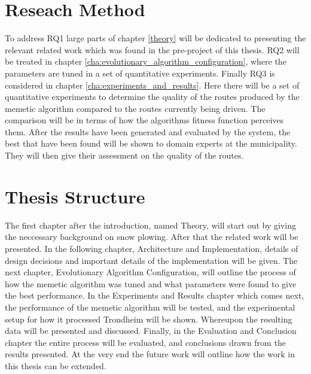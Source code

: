 \section{Reseach Method}

To address RQ1 large parts of chapter \ref{theory} will be dedicated to presenting the relevant related work which was found in the pre-project of this thesis. RQ2 will be treated in chapter \ref{cha:evolutionary_algorithm_configuration}, where the parameters are tuned in a set of quantitative experiments. Finally RQ3 is considered in chapter \ref{cha:experiments_and_results}. Here there will be a set of quantitative experiments to determine the quality of the routes produced by the memetic algorithm compared to the routes currently being driven. The comparison will be in terms of how the algorithms fitness function perceives them. After the results have been generated and evaluated by the system, the best that have been found will be shown to domain experts at the municipality. They will then give their assessment on the quality of the routes.

\section{Thesis Structure}

The first chapter after the introduction, named Theory, will start out by giving the neccessary background on snow plowing. After that the related work will be presented. In the following chapter, Architecture and Implementation, details of design decisions and important details of the implementation will be given. The next chapter, Evolutionary Algorithm Configuration, will outline the process of how the memetic algorithm was tuned and what parameters were found to give the best performance. In the Experiments and Results chapter which comes next, the performance of the memetic algorithm will be tested, and the experimental setup for how it processed Trondheim will be shown. Whereupon the resulting data will be presented and discussed. Finally, in the Evaluation and Conclusion chapter the entire process will be evaluated, and conclusions drawn from the results presented. At the very end the future work will outline how the work in this thesis can be extended.

\cleardoublepage
